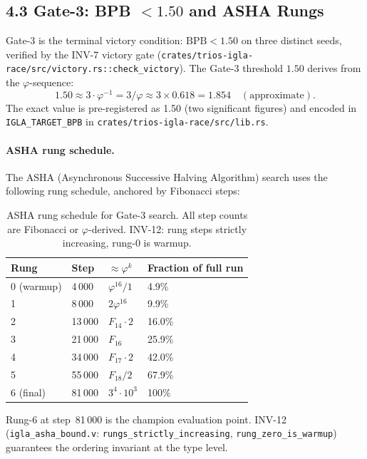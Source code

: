 \subsection{4.3 Gate-3: BPB $< 1.50$ and ASHA Rungs}
\label{subsec:ch25-gate3}

Gate-3 is the terminal victory condition: $\mathrm{BPB} < 1.50$ on
three distinct seeds, verified by the INV-7 victory gate
(\texttt{crates/trios-igla-race/src/victory.rs::check\_victory}).
The Gate-3 threshold $1.50$ derives from the $\varphi$-sequence:
\[
  1.50 \approx 3 \cdot \varphi^{-1} = 3 / \varphi
  \approx 3 \times 0.618 = 1.854 \quad (\text{approximate}).
\]
The exact value is pre-registered as 1.50 (two significant figures)
and encoded in \texttt{IGLA\_TARGET\_BPB} in
\texttt{crates/trios-igla-race/src/lib.rs}.

\paragraph{ASHA rung schedule.}
The ASHA (Asynchronous Successive Halving Algorithm) search
\citep{li2018hyperband} uses the following rung schedule,
anchored by Fibonacci steps:
%
\begin{table}[h]
\centering
\caption{ASHA rung schedule for Gate-3 search.
  All step counts are Fibonacci or $\varphi$-derived.
  INV-12: rung steps strictly increasing, rung-0 is warmup.}
\label{tab:asha-rungs}
\begin{tabular}{llll}
\toprule
Rung & Step & $\approx\varphi^k$ & Fraction of full run\\
\midrule
0 (warmup) & 4\,000  & $\varphi^{16}/1$  & 4.9\%\\
1           & 8\,000  & $2\varphi^{16}$   & 9.9\%\\
2           & 13\,000 & $F_{14}\cdot 2$   & 16.0\%\\
3           & 21\,000 & $F_{16}$          & 25.9\%\\
4           & 34\,000 & $F_{17}\cdot 2$   & 42.0\%\\
5           & 55\,000 & $F_{18}/2$        & 67.9\%\\
6 (final)  & 81\,000 & $3^4\cdot 10^3$   & 100\%\\
\bottomrule
\end{tabular}
\end{table}
%
Rung-6 at step~81\,000 is the champion evaluation point.
INV-12 (\texttt{igla\_asha\_bound.v}: \texttt{rungs\_strictly\_increasing},
\texttt{rung\_zero\_is\_warmup}) guarantees the ordering invariant
at the type level.

